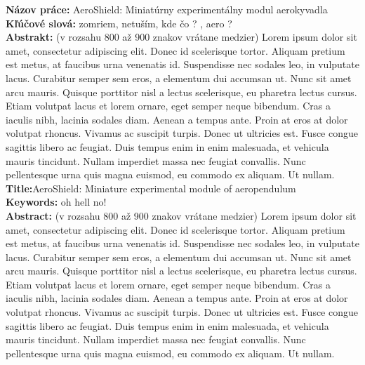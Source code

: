 \noindent
\textbf{Názov práce:} AeroShield: Miniatúrny experimentálny modul aerokyvadla\\
\textbf{Kľúčové slová: } zomriem, netuším, kde čo ? , aero ? \\
\textbf{Abstrakt: } (v rozsahu 800 až 900 znakov vrátane medzier) Lorem ipsum dolor sit amet, consectetur adipiscing elit. Donec id scelerisque tortor. Aliquam pretium est metus, at faucibus urna venenatis id. Suspendisse nec sodales leo, in vulputate lacus. Curabitur semper sem eros, a elementum dui accumsan ut. Nunc sit amet arcu mauris. Quisque porttitor nisl a lectus scelerisque, eu pharetra lectus cursus. Etiam volutpat lacus et lorem ornare, eget semper neque bibendum. Cras a iaculis nibh, lacinia sodales diam. Aenean a tempus ante. Proin at eros at dolor volutpat rhoncus. Vivamus ac suscipit turpis. Donec ut ultricies est. Fusce congue sagittis libero ac feugiat. Duis tempus enim in enim malesuada, et vehicula mauris tincidunt. Nullam imperdiet massa nec feugiat convallis. Nunc pellentesque urna quis magna euismod, eu commodo ex aliquam. Ut nullam.\\

\noindent
\textbf{Title:}AeroShield: Miniature experimental module of aeropendulum \\
\textbf{Keywords: } oh hell no!\\
\textbf{Abstract: } (v rozsahu 800 až 900 znakov vrátane medzier) Lorem ipsum dolor sit amet, consectetur adipiscing elit. Donec id scelerisque tortor. Aliquam pretium est metus, at faucibus urna venenatis id. Suspendisse nec sodales leo, in vulputate lacus. Curabitur semper sem eros, a elementum dui accumsan ut. Nunc sit amet arcu mauris. Quisque porttitor nisl a lectus scelerisque, eu pharetra lectus cursus. Etiam volutpat lacus et lorem ornare, eget semper neque bibendum. Cras a iaculis nibh, lacinia sodales diam. Aenean a tempus ante. Proin at eros at dolor volutpat rhoncus. Vivamus ac suscipit turpis. Donec ut ultricies est. Fusce congue sagittis libero ac feugiat. Duis tempus enim in enim malesuada, et vehicula mauris tincidunt. Nullam imperdiet massa nec feugiat convallis. Nunc pellentesque urna quis magna euismod, eu commodo ex aliquam. Ut  nullam.
\cleardoublepage
